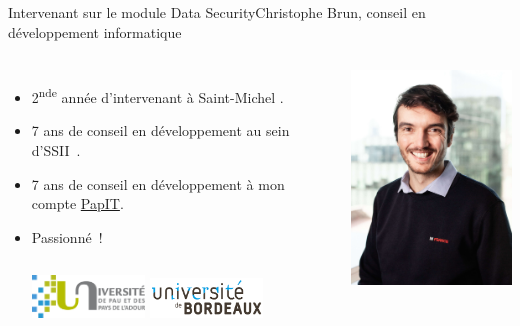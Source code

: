 \documentclass{beamer}
\begin{document}
    \begin{frame}{Intervenant sur le module Data Security}{Christophe Brun, conseil en développement informatique}

        \begin{columns}
            \begin{itemize}
                \item 2\textsuperscript{nde} année d'intervenant à Saint-Michel .

                \item 7 ans de conseil en développement au sein d'SSII~.

                \item 7 ans de conseil en développement à mon compte \href{https://papit.fr}{PapIT}.

                \item Passionné~!
                \bigbreak
                \begin{columns}
                    \centering
                    \includegraphics[width=3cm]{image/logo-uppa}
                    \centering
                    \includegraphics[width=3cm]{image/logo-universite-bordeaux}
                \end{columns}
            \end{itemize}
            \centering
            \includegraphics[width=5cm]{image/trombine-christophe}
        \end{columns}
    \end{frame}
\end{document}
